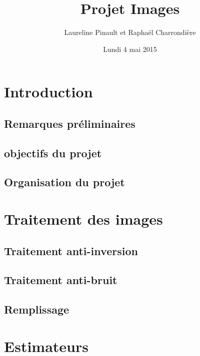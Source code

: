 \documentclass{article}
\title{Projet Images}
\author[$\dag$]{Laureline Pinault et Raphaël Charrondière}
\affil[$\dag$]{ENS de Lyon, France}
\date{Lundi 4 mai 2015}
\begin{document}
  \maketitle

  \begin{abstract}
   
  \end{abstract}
  
  \newpage

  \tableofcontents

  \newpage
  
  \section{Introduction}
  
    \subsection{Remarques préliminaires}
    
    \subsection{objectifs du projet}
  
    \subsection{Organisation du projet}
  
  \section{Traitement des images}
  
    \subsection{Traitement anti-inversion}
  
    \subsection{Traitement anti-bruit}
    
    \subsection{Remplissage}
    
  \section{Estimateurs}
  
\end{document}
